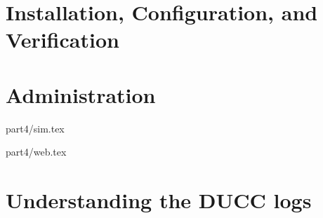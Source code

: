% 
% 
% 
% 

\ifpdf
\else
{}
\fi
\chapter{Installation, Configuration, and Verification}


\ifpdf
\else
{}
\fi
\chapter{Administration}















 {part4/sim.tex}

 {part4/web.tex}

\chapter{Understanding the DUCC logs}

